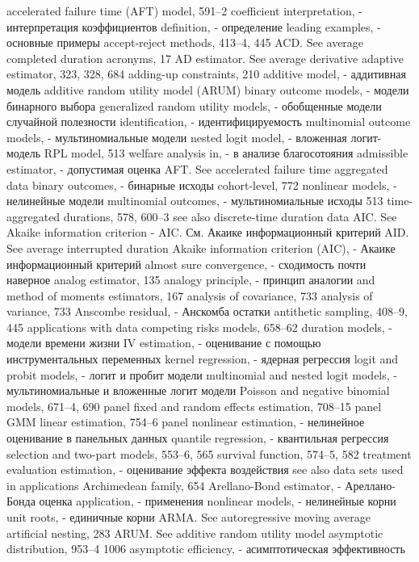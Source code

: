 accelerated failure time (AFT) model, 591–2 
coefficient interpretation, - интерпретация коэффициентов
definition, - определение
leading examples, - основные примеры
accept-reject methods, 413–4, 445 ACD. See average completed duration acronyms, 17
AD estimator. See average derivative adaptive estimator, 323, 328, 684 adding-up constraints, 210
additive model, - аддитивная модель
additive random utility model (ARUM)
binary outcome models, - модели бинарного выбора
generalized random utility models, - обобщенные модели случайной полезности
identification, - идентифицируемость
multinomial outcome models, - мультиномиальные модели
nested logit model, - вложенная логит-модель
RPL model, 513
welfare analysis in, - в анализе благосотояния
admissible estimator, - допустимая оценка
AFT. See accelerated failure time aggregated data
binary outcomes, - бинарные исходы
cohort-level, 772
nonlinear models, - нелинейные модели
multinomial outcomes, - мультиномиальные исходы
513 time-aggregated durations, 578, 600–3 see also discrete-time duration data
AIC. See Akaike information criterion - AIC. См. Акаике информационный критерий
AID. See average interrupted duration
Akaike information criterion (AIC), - Акаике информационный критерий
almost sure convergence, - сходимость почти наверное 
analog estimator, 135
analogy principle, - принцип аналогии
and method of moments estimators, 167 analysis of covariance, 733
analysis of variance, 733
Anscombe residual, - Анскомба остатки
antithetic sampling, 408–9, 445 applications with data
competing risks models, 658–62
duration models, - модели времени жизни
IV estimation, - оценивание с помощью инструментальных переменных
kernel regression, - ядерная регрессия
logit and probit models, - логит и пробит модели
multinomial and nested logit models, - мультиномиальные и вложенные логит модели
Poisson and negative binomial models, 671–4, 690 panel fixed and random effects estimation, 708–15 panel GMM linear estimation, 754–6
panel nonlinear estimation, - нелинейное оценивание в панельных данных
quantile regression, - квантильная регрессия
selection and two-part models, 553–6, 565 survival function, 574–5, 582
treatment evaluation estimation, - оценивание эффекта воздействия
see also data sets used in applications Archimedean family, 654 
Arellano-Bond estimator, - Ареллано-Бонда оценка
application, - применения
nonlinear models, - нелинейные корни 
unit roots, - единичные корни
ARMA. See autoregressive moving average artificial nesting, 283
ARUM. See additive random utility model asymptotic distribution, 953–4
1006
asymptotic efficiency, - асимптотическая эффективность
